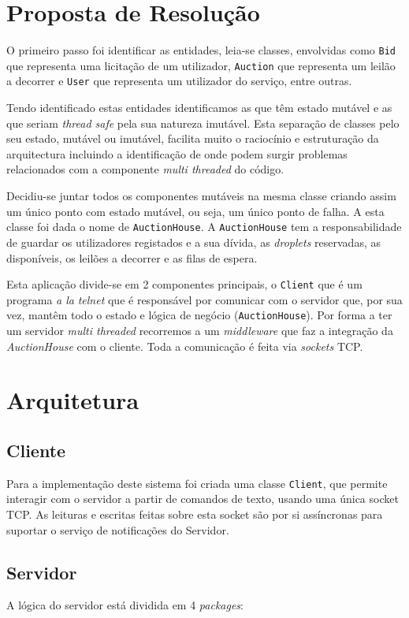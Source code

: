 \documentclass[a4paper]{article}
\begin{document}
\section{Proposta de Resolução}

O primeiro passo foi identificar as entidades, leia-se classes, envolvidas como \texttt{Bid} que representa uma licitação de um utilizador, \texttt{Auction} que representa um leilão a decorrer e \texttt{User} que representa um utilizador do serviço, entre outras.

Tendo identificado estas entidades identificamos as que têm estado mutável e as que seriam \textit{thread safe} pela sua natureza imutável. Esta separação de classes pelo seu estado, mutável ou imutável, facilita muito o raciocínio e estruturação da arquitectura incluindo a identificação de onde podem surgir problemas relacionados com a componente \textit{multi threaded} do código.

Decidiu-se juntar todos os componentes mutáveis na mesma classe criando assim um único ponto com estado mutável, ou seja, um único ponto de falha. A esta classe foi dada o nome de \texttt{AuctionHouse}. A \texttt{AuctionHouse} tem a responsabilidade de guardar os utilizadores registados e a sua dívida, as \textit{droplets} reservadas, as disponíveis, os leilões a decorrer e as filas de espera. 

Esta aplicação divide-se em 2 componentes principais, o \texttt{Client} que é um programa \textit{a la} \textit{telnet} que é responsável por comunicar com o servidor que, por sua vez, mantêm todo o estado e lógica de negócio (\texttt{AuctionHouse}). Por forma a ter um servidor \textit{multi threaded} recorremos a um \textit{middleware} que faz a integração da \textit{AuctionHouse} com o cliente. Toda a comunicação é feita via \textit{sockets} TCP.

\section{Arquitetura}
\subsection{Cliente}
Para a implementação deste sistema foi criada uma classe \texttt{Client}, que permite interagir com o servidor a partir de comandos de texto, usando uma única socket TCP. As leituras e escritas feitas sobre esta socket são por si assíncronas para suportar o serviço de notificações do Servidor.

\subsection{Servidor}
A lógica do servidor está dividida em 4 \textit{packages}:
\end{document}
